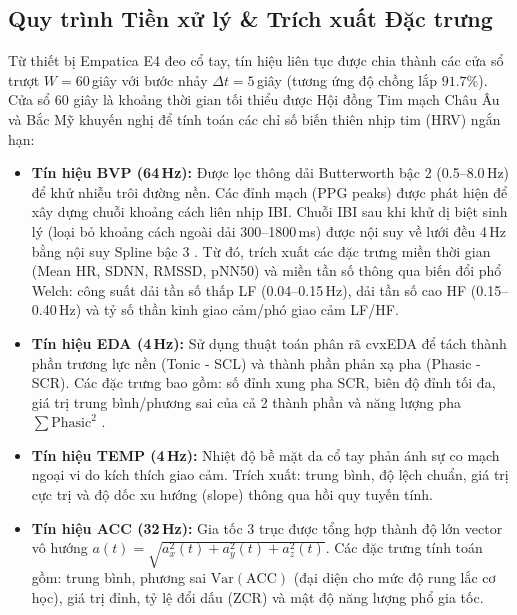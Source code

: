 \documentclass[conference]{IEEEtran}
\begin{document}
\subsection{Quy trình Tiền xử lý \& Trích xuất Đặc trưng}
Từ thiết bị Empatica E4 đeo cổ tay, tín hiệu liên tục được chia thành các cửa sổ trượt $W = 60$\,giây với bước nhảy $\Delta t = 5$\,giây (tương ứng độ chồng lắp $91.7\%$). Cửa sổ 60 giây là khoảng thời gian tối thiểu được Hội đồng Tim mạch Châu Âu và Bắc Mỹ \cite{taskforce1996heart} khuyến nghị để tính toán các chỉ số biến thiên nhịp tim (HRV) ngắn hạn:
\begin{itemize}
    \item \textbf{Tín hiệu BVP (64\,Hz):} Được lọc thông dải Butterworth bậc 2 (0.5--8.0\,Hz) để khử nhiễu trôi đường nền. Các đỉnh mạch (PPG peaks) được phát hiện để xây dựng chuỗi khoảng cách liên nhịp IBI. Chuỗi IBI sau khi khử dị biệt sinh lý (loại bỏ khoảng cách ngoài dải 300--1800\,ms) được nội suy về lưới đều 4\,Hz bằng nội suy Spline bậc 3 \cite{tarvainen2014kubios}. Từ đó, trích xuất các đặc trưng miền thời gian (Mean HR, SDNN, RMSSD, pNN50) và miền tần số thông qua biến đổi phổ Welch: công suất dải tần số thấp LF (0.04--0.15\,Hz), dải tần số cao HF (0.15--0.40\,Hz) và tỷ số thần kinh giao cảm/phó giao cảm LF/HF.
    \item \textbf{Tín hiệu EDA (4\,Hz):} Sử dụng thuật toán phân rã cvxEDA \cite{greco2016cvxeda} để tách thành phần trương lực nền (Tonic - SCL) và thành phần phản xạ pha (Phasic - SCR). Các đặc trưng bao gồm: số đỉnh xung pha SCR, biên độ đỉnh tối đa, giá trị trung bình/phương sai của cả 2 thành phần và năng lượng pha $\sum \text{Phasic}^2$ \cite{boucsein2012electrodermal}.
    \item \textbf{Tín hiệu TEMP (4\,Hz):} Nhiệt độ bề mặt da cổ tay phản ánh sự co mạch ngoại vi do kích thích giao cảm. Trích xuất: trung bình, độ lệch chuẩn, giá trị cực trị và độ dốc xu hướng (slope) thông qua hồi quy tuyến tính.
    \item \textbf{Tín hiệu ACC (32\,Hz):} Gia tốc 3 trục được tổng hợp thành độ lớn vector vô hướng $a(t) = \sqrt{a_x^2(t) + a_y^2(t) + a_z^2(t)}$. Các đặc trưng tính toán gồm: trung bình, phương sai $\text{Var}(\text{ACC})$ (đại diện cho mức độ rung lắc cơ học), giá trị đỉnh, tỷ lệ đổi dấu (ZCR) và mật độ năng lượng phổ gia tốc.
\end{itemize}
\end{document}
